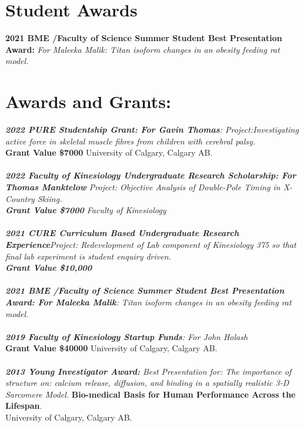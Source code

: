 \documentclass[]{friggeri-cv}
\begin{document}
\section{Student Awards}
\textbf{2021 BME /Faculty of Science Summer Student Best Presentation Award:}\emph{ For Maleeka Malik: Titan isoform changes in an obesity feeding rat model.}



\section{Awards and Grants:\\}
\emph{\textbf{2022 PURE Studentship Grant: For Gavin Thomas}: Project:Investigating active force in skeletal muscle fibres from children with cerebral palsy.\\}
{\textbf{Grant Value \$7000 }}{University of Calgary, Calgary AB.\\}
\\
\emph{\textbf{2022 Faculty of Kinesiology Undergraduate Research Scholarship: For Thomas Manktelow}{ Project: Objective Analysis of Double-Pole Timing in X-Country Skiing.\\}{\textbf{Grant Value \$7000} Faculty of Kinesiology\\}}
\\
\emph{\textbf{2021 CURE Curriculum Based Undergraduate Research Experience}{Project: Redevelopment of Lab component of Kinesiology 375 so that final lab experiment is student enquiry driven.\\}{\textbf{Grant Value \$10,000}}}\\
\\
\emph{\textbf{2021 BME /Faculty of Science Summer Student Best Presentation Award: For Maleeka Malik}: Titan isoform changes in an obesity feeding rat model.\\}
\\
\emph{\textbf{2019 Faculty of Kinesiology Startup Funds}: For John Holash\\}
\textbf{{Grant Value \$40000}}{ University of Calgary, Calgary AB.\\}
\\
\emph{\textbf{2013 Young Investigator Award:} Best Presentation for: The importance of structure on: calcium release, diffusion, and binding in a spatially realistic 3-D Sarcomere Model. }
{\textbf{Bio-medical Basis for Human Performance Across the Lifespan}.\\}
{University of Calgary, Calgary AB.\\}
\end{document}
